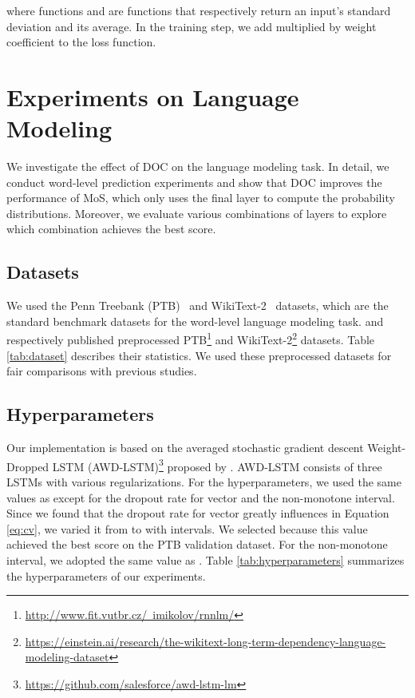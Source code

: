 \documentclass[11pt,a4paper]{article}
\begin{document}
where functions  and  are functions that respectively return an input's standard deviation and its average.
In the training step, we add  multiplied by weight coefficient  to the loss function.



\section{Experiments on Language Modeling}
\label{sec:lm_exp}
We investigate the effect of DOC on the language modeling task.
In detail, we conduct word-level prediction experiments and show that DOC improves the performance of MoS, which only uses the final layer to compute the probability distributions.
Moreover, we evaluate various combinations of layers to explore which combination achieves the best score.



\subsection{Datasets}
We used the Penn Treebank (PTB)~\cite{Marcus:1993:BLA:972470.972475} and WikiText-2~\cite{DBLP:journals/corr/MerityXBS16} datasets, which are the standard benchmark datasets for the word-level language modeling task.
 and  respectively published preprocessed PTB\footnote{\href{http://www.fit.vutbr.cz/~imikolov/rnnlm/}{{http://www.fit.vutbr.cz/~imikolov/rnnlm/}}} and WikiText-2\footnote{\href{https://einstein.ai/research/the-wikitext-long-term-dependency-language-modeling-dataset}{{https://einstein.ai/research/the-wikitext-long-term-dependency-language-modeling-dataset}}} datasets.
Table \ref{tab:dataset} describes their statistics.
We used these preprocessed datasets for fair comparisons with previous studies.


\subsection{Hyperparameters}
Our implementation is based on the averaged stochastic gradient descent Weight-Dropped LSTM (AWD-LSTM)\footnote{\href{https://github.com/salesforce/awd-lstm-lm}{https://github.com/salesforce/awd-lstm-lm}} proposed by .
AWD-LSTM consists of three LSTMs with various regularizations.
For the hyperparameters, we used the same values as  except for the dropout rate for vector  and the non-monotone interval.
Since we found that the dropout rate for vector  greatly influences  in Equation \ref{eq:cv}, we varied it from  to  with  intervals.
We selected  because this value achieved the best score on the PTB validation dataset.
For the non-monotone interval, we adopted the same value as .
Table \ref{tab:hyperparameters} summarizes the hyperparameters of our experiments.
\end{document}
